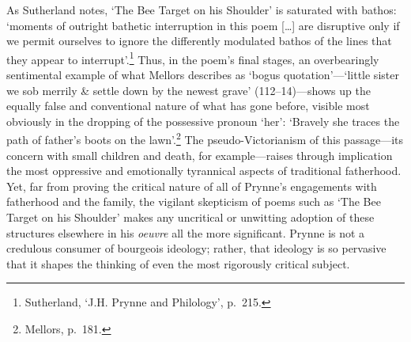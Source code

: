 \documentclass[]{article}
\begin{document}
\noindent As Sutherland notes, `The Bee Target on his Shoulder' is
saturated with bathos: `moments of outright bathetic interruption in
this poem {[}\ldots{}{]} are disruptive only if we permit ourselves to
ignore the differently modulated bathos of the lines that they appear to
interrupt'.\footnote{Sutherland, `J.H. Prynne and Philology', p.~215.}
Thus, in the poem's final stages, an overbearingly sentimental example
of what Mellors describes as `bogus quotation'---`little \textbar{}
sister we sob merrily \& settle down \textbar{} by the newest grave'
(112--14)---shows up the equally false and conventional nature of what
has gone before, visible most obviously in the dropping of the
possessive pronoun `her': `Bravely she traces \textbar{} the path of
father's boots \textbar{} on the lawn'.\footnote{Mellors, p.~181.} The
pseudo-Victorianism of this passage---its concern with small children
and death, for example---raises through implication the most oppressive
and emotionally tyrannical aspects of traditional fatherhood. Yet, far
from proving the critical nature of all of Prynne's engagements with
fatherhood and the family, the vigilant skepticism of poems such as `The
Bee Target on his Shoulder' makes any uncritical or unwitting adoption
of these structures elsewhere in his \emph{oeuvre} all the more
significant. Prynne is not a credulous consumer of bourgeois ideology;
rather, that ideology is so pervasive that it shapes the thinking of
even the most rigorously critical subject.
\end{document}
